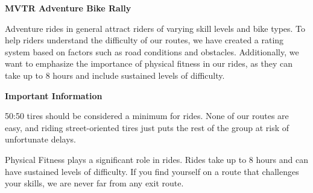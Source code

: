\documentclass{article}
\begin{document}
\begin{center}
    {\fontsize{28}{36}\selectfont\bfseries MVTR Adventure Bike Rally}
\end{center}

\vspace{1em}

Adventure rides in general attract riders of varying skill levels and bike types. To help riders understand the difficulty of our routes, we have created a rating system based on factors such as road conditions and obstacles. Additionally, we want to emphasize the importance of physical fitness in our rides, as they can take up to 8 hours and include sustained levels of difficulty.

\vspace{1em}

\noindent
\begin{minipage}[t]{0.45\linewidth}
    \textbf{Important Information}
    
    \vspace{0.5em}
    
    50:50 tires should be considered a minimum for rides. None of our routes are easy, and riding street-oriented tires just puts the rest of the group at risk of unfortunate delays.
    
    \vspace{1.5em}
    
    \noindent Physical Fitness plays a significant role in rides. Rides take up to 8 hours and can have sustained levels of difficulty. If you find yourself on a route that challenges your skills, we are never far from any exit route.
\end{minipage}

\hfill
\end{document}
